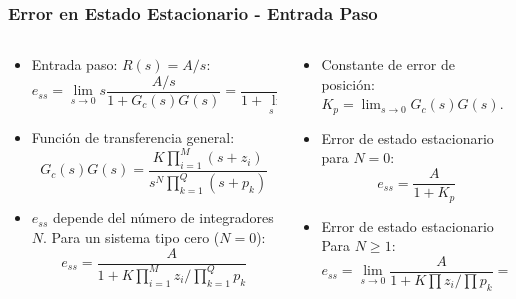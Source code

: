 \documentclass[aspectratio=169,handout]{beamer}
\theoremstyle{definition}
\theoremstyle{plain}
\theoremstyle{remark}
\begin{document}
\begin{frame}[<+->]\frametitle{Error en Estado Estacionario - Entrada Paso}
\begin{columns}
\begin{column}{0.6\textwidth}
\begin{itemize}
		\item Entrada paso: $R(s) = A/s$:
		\begin{equation*}
			e_{ss} = \lim_{s \rightarrow 0} s \frac{A/s}{1+G_c(s)G(s)} = \frac{A}{1 + \lim_{s \rightarrow 0}G_c(s)G(s)}
		\end{equation*}
		\item Función de transferencia general:
		\begin{equation*}
			G_c(s)G(s) = \frac{K\prod_{i=1}^M(s+z_i)}{s^N \prod_{k=1}^Q (s+p_k)}
		\end{equation*}
		\item $e_{ss}$ depende del número de integradores $N$. Para un sistema tipo cero ($N=0$):
		\begin{equation*}
			e_{ss} = \frac{A}{1+K\prod_{i=1}^M z_i/\prod_{k=1}^Q p_k}
		\end{equation*}
\end{itemize}	
\end{column}	
\begin{column}{0.4\textwidth}
\begin{itemize}
		\item Constante de error de posición: $K_p = \lim_{s \rightarrow 0} G_c(s)G(s)$.
		\item Error de estado estacionario para $N = 0$:
		\begin{equation*}
			e_{ss} = \frac{A}{1 + K_p}
		\end{equation*}
		\item Error de estado estacionario Para $N \geq 1$:
		\begin{equation*}
			e_{ss} = \lim_{s \rightarrow 0} \frac{A}{1 + K\prod z_i/\prod p_k} = 0
		\end{equation*}
\end{itemize}	
\end{column}	
\end{columns}
\end{frame}
\end{document}

